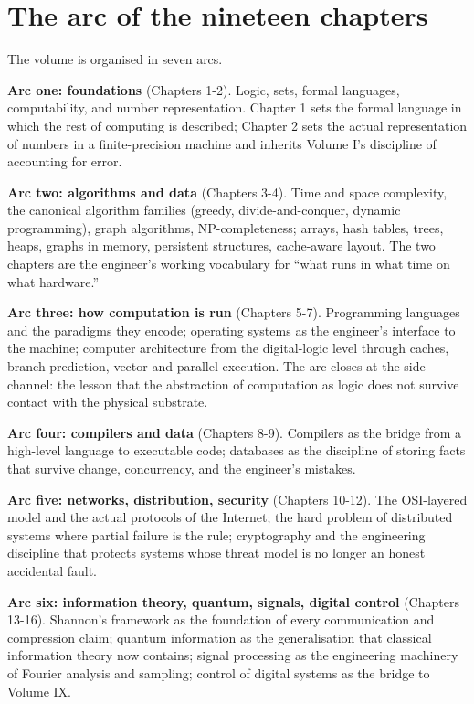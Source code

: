 \section*{The arc of the nineteen chapters}

The volume is organised in seven arcs.

\textbf{Arc one: foundations} (Chapters 1-2). Logic, sets, formal languages, computability, and number representation. Chapter 1 sets the formal language in which the rest of computing is described; Chapter 2 sets the actual representation of numbers in a finite-precision machine and inherits Volume I's discipline of accounting for error.

\textbf{Arc two: algorithms and data} (Chapters 3-4). Time and space complexity, the canonical algorithm families (greedy, divide-and-conquer, dynamic programming), graph algorithms, NP-completeness; arrays, hash tables, trees, heaps, graphs in memory, persistent structures, cache-aware layout. The two chapters are the engineer's working vocabulary for ``what runs in what time on what hardware.''

\textbf{Arc three: how computation is run} (Chapters 5-7). Programming languages and the paradigms they encode; operating systems as the engineer's interface to the machine; computer architecture from the digital-logic level through caches, branch prediction, vector and parallel execution. The arc closes at the side channel: the lesson that the abstraction of computation as logic does not survive contact with the physical substrate.

\textbf{Arc four: compilers and data} (Chapters 8-9). Compilers as the bridge from a high-level language to executable code; databases as the discipline of storing facts that survive change, concurrency, and the engineer's mistakes.

\textbf{Arc five: networks, distribution, security} (Chapters 10-12). The OSI-layered model and the actual protocols of the Internet; the hard problem of distributed systems where partial failure is the rule; cryptography and the engineering discipline that protects systems whose threat model is no longer an honest accidental fault.

\textbf{Arc six: information theory, quantum, signals, digital control} (Chapters 13-16). Shannon's framework as the foundation of every communication and compression claim; quantum information as the generalisation that classical information theory now contains; signal processing as the engineering machinery of Fourier analysis and sampling; control of digital systems as the bridge to Volume IX.

